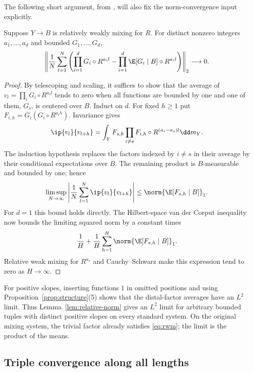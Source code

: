 The following short argument, from
\cite[Lemma~2.3]{FourfoldCompanion}, will also fix the norm-convergence
input explicitly.
\begin{lemma}\label{lem:relative-norm}
Suppose $Y\to B$ is relatively weakly mixing for $R$. For distinct
nonzero integers $a_1,\ldots,a_d$ and bounded $G_1,\ldots,G_d$,
\begin{equation}\label{eq:relative-norm}
 \left\|\frac1N\sum_{l=1}^N
 \left(\prod_{i=1}^dG_i\circ R^{a_il}
       -\prod_{i=1}^d\E[G_i\mid B]\circ R^{a_il}\right)\right\|_2
 \longrightarrow0.
\end{equation}
\end{lemma}
\begin{proof}
By telescoping and scaling, it suffices to show that the average of
$v_l=\prod_i G_i\circ R^{a_il}$ tends to zero when all functions
are bounded by one and one of them, $G_s$, is centered over $B$.
Induct on $d$. For fixed $h\ge1$ put
$F_{i,h}=\overline{G_i}(G_i\circ R^{a_ih})$. Invariance gives
\[
 \ip{v_l}{v_{l+h}}
 =\int_Y F_{s,h}\prod_{i\ne s}
                  F_{i,h}\circ R^{(a_i-a_s)l}\dd m_Y.
\]
The induction hypothesis replaces the factors indexed by $i\ne s$
in their average by their conditional expectations over $B$. The
remaining product is $B$-measurable and bounded by one; hence
\[
 \limsup_{N\to\infty}
 \left|\frac1N\sum_{l=1}^N\ip{v_l}{v_{l+h}}\right|
 \le\norm{\E[F_{s,h}\mid B]}_1.
\]
For $d=1$ this bound holds directly. The Hilbert-space van der
Corput inequality now bounds the limiting squared norm by a constant
times
\[
 \frac1H+\frac1H\sum_{h=1}^H\norm{\E[F_{s,h}\mid B]}_1.
\]
Relative weak mixing for $R^{a_s}$ and Cauchy--Schwarz make this
expression tend to zero as $H\to\infty$.
\end{proof}

For positive slopes, inserting functions $1$ in omitted positions
and using Proposition~\ref{prop:structure}(5) shows that the
distal-factor averages have an $L^2$ limit. Thus
Lemma~\ref{lem:relative-norm} gives an $L^2$ limit for arbitrary
bounded tuples with distinct positive slopes on every standard
system. On the original mixing system, the trivial factor already
satisfies \eqref{eq:rwm}; the limit is the product of the means.

\subsection{Triple convergence along all lengths}


